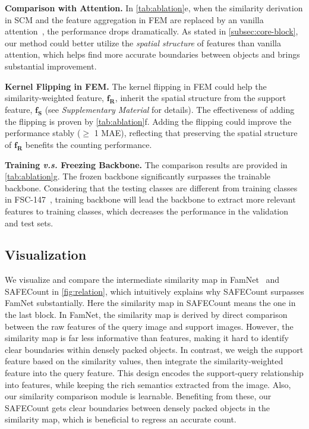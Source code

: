 \documentclass[10pt,twocolumn,letterpaper]{article}
\newcommand{\method}{SAFECount\xspace}
\newcommand{\supp}{\textit{Supplementary Material}\xspace}
\newcommand{\fs}{\bm{f_S}}
\newcommand{\fweight}{\bm{f_R}}
\begin{document}
\noindent \textbf{Comparison with Attention.} In \cref{tab:ablation}e, when the similarity derivation in SCM and the feature aggregation in FEM are replaced by an vanilla attention~\cite{attention_need}, the performance drops dramatically. As stated in \cref{subsec:core-block}, our method could better utilize the \textit{spatial structure} of features than vanilla attention, which helps find more accurate boundaries between objects and brings substantial improvement. 


\noindent\textbf{Kernel Flipping in FEM.}
The kernel flipping in FEM could help the similarity-weighted feature, $\fweight$, inherit the spatial structure from the support feature, $\fs$ (see \supp for details). 
The effectiveness of adding the flipping is proven by \cref{tab:ablation}f. 
Adding the flipping could improve the performance stably ($\geq$ 1 MAE), reflecting that preserving the spatial structure of $\fweight$ benefits the counting performance. 


\vspace{2pt}\noindent\textbf{Training \textit{v.s.} Freezing Backbone.} The comparison results are provided in \cref{tab:ablation}g. The frozen backbone significantly surpasses the trainable backbone. Considering that the testing classes are different from training classes in FSC-147~\cite{famnet}, training backbone will lead the backbone to extract more relevant features to training classes, which decreases the performance in the validation and test sets. 








\subsection{Visualization}

We visualize and compare the intermediate similarity map in FamNet~\cite{famnet} and \method in \cref{fig:relation}, which intuitively explains why \method surpasses FamNet substantially. 
Here the similarity map in \method means the one in the last block. 
In FamNet, the similarity map is derived by direct comparison between the raw features of the query image and support images. 
However, the similarity map is far less informative than features, making it hard to identify clear boundaries within densely packed objects. 
In contrast, we weigh the support feature based on the similarity values, then integrate the similarity-weighted feature into the query feature. 
This design encodes the support-query relationship into features, while keeping the rich semantics extracted from the image. 
Also, our similarity comparison module is learnable. 
Benefiting from these, our \method gets clear boundaries between densely packed objects in the similarity map, which is beneficial to regress an accurate count. 
\end{document}
